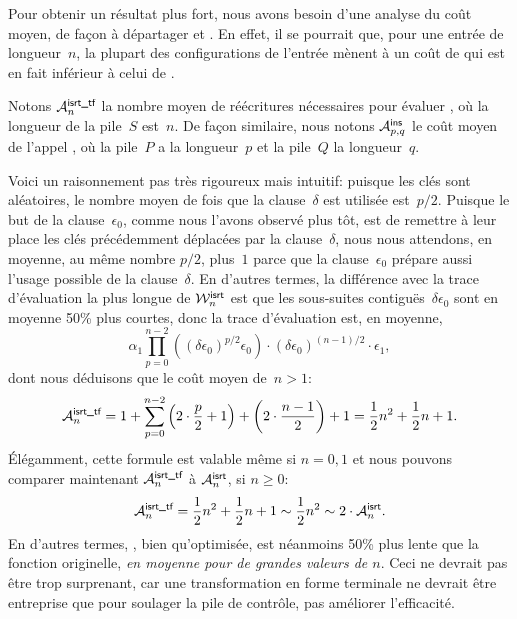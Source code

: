 Pour obtenir un résultat plus fort, nous avons besoin d'une analyse du
coût moyen, de façon à départager  et
. En effet, il se pourrait que, pour une entrée de
longueur~\(n\), la plupart des configurations de l'entrée mènent à un
coût de  qui est en fait inférieur à celui de
.

Notons \(\M{\smash[t]{\fun{isrt\_tf}}}{n}\) la nombre moyen de
réécritures nécessaires pour évaluer , où
la longueur de la pile~\(S\) est~\(n\). De façon similaire, nous
notons \(\M{\fun{ins}}{p,q}\) le coût moyen de l'appel
, où la pile~\(P\) a la longueur~\(p\)
et la pile~\(Q\) la longueur~\(q\).

Voici un raisonnement pas très rigoureux mais intuitif: puisque les
clés sont aléatoires, le nombre moyen de fois que la clause~\(\delta\)
est utilisée est~\(p/2\). Puisque le but de la clause~\(\epsilon_0\),
comme nous l'avons observé plus tôt, est de remettre à leur place les
clés précédemment déplacées par la clause~\(\delta\), nous nous
attendons, en moyenne, au même nombre \(p/2\), plus~\(1\) parce que la
clause~\(\epsilon_0\) prépare aussi l'usage possible de la
clause~\(\delta\). En d'autres termes, la différence avec la trace
d'évaluation la plus longue de \(\W{\fun{isrt}}{n}\) est que les
sous-suites contiguës~\(\delta\epsilon_0\) sont en moyenne 50\% plus
courtes, donc la trace d'évaluation est, en moyenne,
\begin{equation*}
\alpha_1\prod_{p=0}^{n-2}{\left((\delta\epsilon_0)^{p/2}\epsilon_0\right)}
\cdot (\delta\epsilon_0)^{(n-1)/2} \cdot \epsilon_1,
\end{equation*}
dont nous déduisons que le coût moyen de~\(n>1\):
\begin{equation*}
  \M{\fun{isrt\_tf}}{n} = 1 +
  \sum_{p=0}^{n-2}{\left(2\cdot\frac{p}{2}+1\right)}
                       + \left(2\cdot\frac{n-1}{2}\right) + 1
                     = \frac{1}{2}{n^2} + \frac{1}{2}{n} + 1.
\end{equation*}
Élégamment, cette formule est valable même si \(n=0,1\) et nous
pouvons comparer maintenant \(\M{\fun{isrt\_tf}}{n}\) à
\(\M{\fun{isrt}}{n}\), si \(n\geqslant{}0\):
\begin{equation*}
\M{\fun{isrt\_tf}}{n}
  = \frac{1}{2}{n^2} + \frac{1}{2}{n} + 1
  \sim \frac{1}{2}{n^2} \sim 2 \cdot \M{\fun{isrt}}{n}.
\end{equation*}
En d'autres termes, , bien qu'optimisée, est
néanmoins 50\% plus lente que la fonction originelle, \emph{en
  moyenne pour de grandes valeurs de \(n\)}. Ceci ne devrait pas être
trop surprenant, car une transformation en forme terminale ne devrait
être entreprise que pour soulager la pile de contrôle, pas améliorer
l'efficacité.

